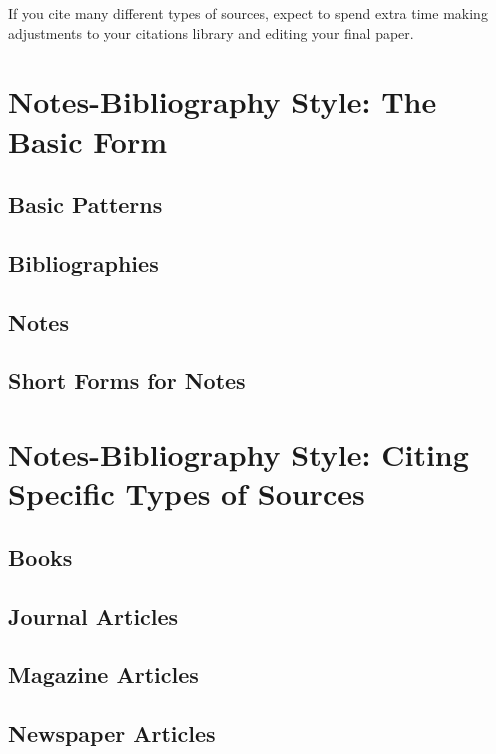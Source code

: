 \documentclass[oneside]{book}
\numberwithin{equation}{section}
\begin{document}
If you cite many different types of sources, expect to spend extra time making adjustments to your citations library and editing your final paper.


\chapter{Notes-Bibliography Style: The Basic Form}

\section{Basic Patterns}

\section{Bibliographies}

\section{Notes}

\section{Short Forms for Notes}


\chapter{Notes-Bibliography Style: Citing Specific Types of Sources}

\section{Books}

\section{Journal Articles}

\section{Magazine Articles}

\section{Newspaper Articles}
\end{document}
